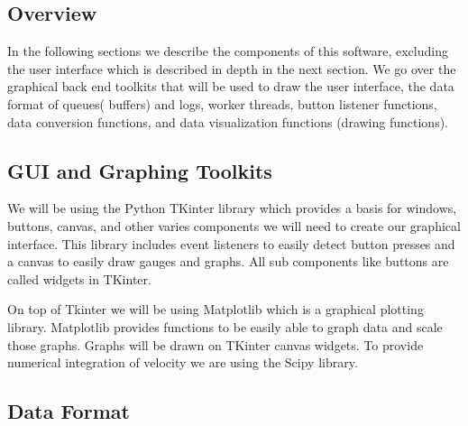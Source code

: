 \documentclass[10pt,draftclsnofoot,onecolumn,compsoc]{IEEEtran}
\begin{document}
\subsection{Overview}
In the following sections we describe the components of this software, excluding the user interface which is described in depth in the next section. We go over the graphical back end toolkits that will be used to draw the user interface, the data format of queues( buffers) and logs, worker threads, button listener functions, data conversion functions, and data visualization functions (drawing functions). \par

\subsection{GUI and Graphing Toolkits}
We will be using the Python TKinter library which provides a basis for windows, buttons, canvas, and other varies components we will need to create our graphical interface. This library includes event listeners to easily detect button presses and a canvas to easily draw gauges and graphs. All sub components like buttons are called widgets in TKinter. \par
On top of Tkinter we will be using Matplotlib which is a graphical plotting library. Matplotlib provides functions to be easily able to graph data and scale those graphs. Graphs will be drawn on TKinter canvas widgets. To provide numerical integration of velocity we are using the Scipy library.\par

\subsection{Data Format}
\end{document}
